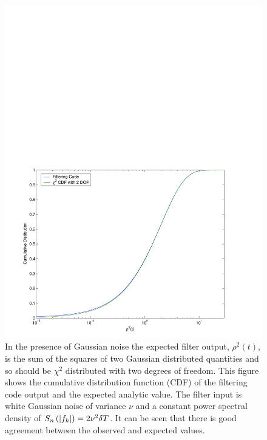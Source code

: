 \begin{figure}[htb]
\label{f:rhosq_gaussian_cdf}
\begin{center}
\includegraphics[width=\linewidth]{figures/findchirp/rhosq_gaussian_cdf}
\end{center}
\caption{%
In the presence of Gaussian noise the expected filter output, $\rho^2(t)$, is
the sum of the squares of two Gaussian distributed quantities and so should be
$\chi^2$ distributed with two degrees of freedom. This figure shows the
cumulative distribution function (CDF) of the filtering code output and the
expected analytic value. The filter input is white Gaussian noise of variance
$\nu$ and a constant power spectral density of $S_n\left(\left|f_{k}\right|\right) = 2\nu^2\delta T$. It
can be seen that there is good agreement between the observed and expected
values.
}
\end{figure}

